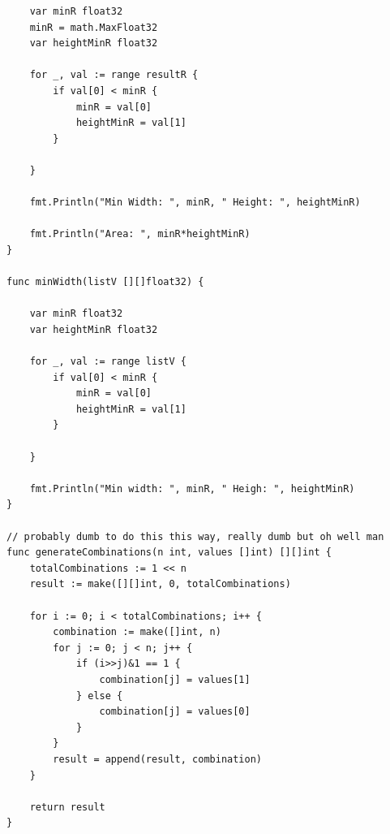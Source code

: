 \documentclass[a4paper]{article}
\begin{document}
\begin{verbatim}
	var minR float32
	minR = math.MaxFloat32
	var heightMinR float32

	for _, val := range resultR {
		if val[0] < minR {
			minR = val[0]
			heightMinR = val[1]
		}

	}

	fmt.Println("Min Width: ", minR, " Height: ", heightMinR)

	fmt.Println("Area: ", minR*heightMinR)
}

func minWidth(listV [][]float32) {

	var minR float32
	var heightMinR float32

	for _, val := range listV {
		if val[0] < minR {
			minR = val[0]
			heightMinR = val[1]
		}

	}

	fmt.Println("Min width: ", minR, " Heigh: ", heightMinR)
}

// probably dumb to do this this way, really dumb but oh well man
func generateCombinations(n int, values []int) [][]int {
	totalCombinations := 1 << n
	result := make([][]int, 0, totalCombinations)

	for i := 0; i < totalCombinations; i++ {
		combination := make([]int, n)
		for j := 0; j < n; j++ {
			if (i>>j)&1 == 1 {
				combination[j] = values[1]
			} else {
				combination[j] = values[0]
			}
		}
		result = append(result, combination)
	}

	return result
}


\end{verbatim}

\newpage 

 

\end{document}

